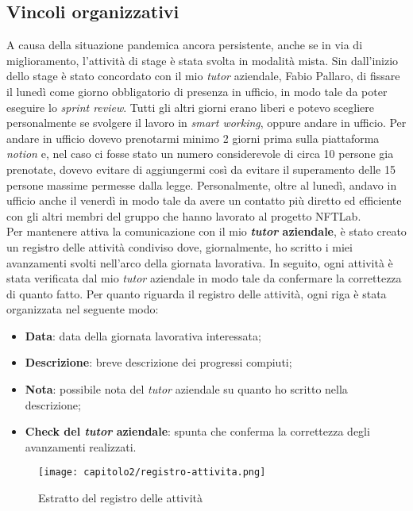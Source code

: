 \subsection{Vincoli organizzativi}
A causa della situazione pandemica ancora persistente, anche se in via di miglioramento, l'attività di stage è stata svolta in modalità mista. Sin dall'inizio dello stage è stato concordato con il mio \emph{tutor} aziendale, Fabio Pallaro, di fissare il lunedì come giorno obbligatorio di presenza in ufficio, in modo tale da poter eseguire lo \emph{sprint review}. 
Tutti gli altri giorni erano liberi e potevo scegliere personalmente se svolgere il lavoro in \emph{smart working}, oppure andare in ufficio. Per andare in ufficio dovevo prenotarmi minimo 2 giorni prima sulla piattaforma \emph{notion} e, nel caso ci fosse stato un numero considerevole di circa 10 persone gia prenotate, dovevo evitare di aggiungermi così da evitare il superamento delle 15 persone massime permesse dalla legge.
Personalmente, oltre al lunedì, andavo in ufficio anche il venerdì in modo tale da avere un contatto più diretto ed efficiente con gli altri membri del gruppo che hanno lavorato al progetto NFTLab.\\

Per mantenere attiva la comunicazione con il mio \textbf{\emph{tutor} aziendale}, è stato creato un registro delle attività condiviso dove, giornalmente, ho scritto i miei avanzamenti svolti nell'arco della giornata lavorativa. In seguito, ogni attività è stata verificata dal mio \emph{tutor} aziendale in modo tale da confermare la correttezza di quanto fatto. Per quanto riguarda il registro delle attività, ogni riga è stata organizzata nel seguente modo:
\begin{itemize}
  \item \textbf{Data}: data della giornata lavorativa interessata;
  \item \textbf{Descrizione}: breve descrizione dei progressi compiuti; 
  \item \textbf{Nota}: possibile nota del \emph{tutor} aziendale su quanto ho scritto nella descrizione;
  \item \textbf{Check del \emph{tutor} aziendale}: spunta che conferma la correttezza degli avanzamenti realizzati.
\end{itemize}


\begin{figure}[!h]
  \centering
  \texttt{[image: capitolo2/registro-attivita.png]}
  \caption{Estratto del registro delle attività}
\end{figure}

